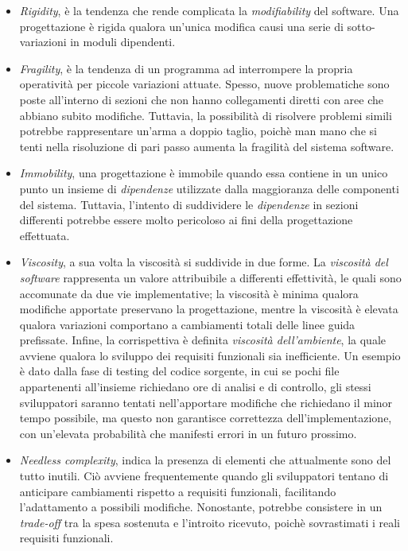 \documentclass{article}
\begin{document}
\begin{itemize}[label={-}]
    \itemsep0em
    \item \textit{Rigidity}, è la tendenza che rende complicata la \textit{modifiability} del software. Una progettazione è rigida qualora un'unica modifica causi una serie di sotto-variazioni in moduli dipendenti.
    \item \textit{Fragility}, è la tendenza di un programma ad interrompere la propria operatività per piccole variazioni attuate. Spesso, nuove problematiche sono poste all'interno di sezioni che non hanno collegamenti diretti con aree che abbiano subito modifiche. Tuttavia, la possibilità di risolvere problemi simili potrebbe rappresentare un'arma a doppio taglio, poichè man mano che si tenti nella risoluzione di pari passo aumenta la fragilità del sistema software.
    \item \textit{Immobility}, una progettazione è immobile quando essa contiene in un unico punto un insieme di \textit{dipendenze} utilizzate dalla maggioranza delle componenti del sistema. Tuttavia, l'intento di suddividere le \textit{dipendenze} in sezioni differenti potrebbe essere molto pericoloso ai fini della progettazione effettuata.
    \item \textit{Viscosity}, a sua volta la viscosità si suddivide in due forme. La \textit{viscosità del software} rappresenta un valore attribuibile a differenti effettività, le quali sono accomunate da due vie implementative; la viscosità è minima qualora modifiche apportate preservano la progettazione, mentre la viscosità è elevata qualora variazioni comportano a cambiamenti totali delle linee guida prefissate. Infine, la corrispettiva è definita \textit{viscosità dell'ambiente}, la quale avviene qualora lo sviluppo dei requisiti funzionali sia inefficiente. Un esempio è dato dalla fase di testing del codice sorgente, in cui se pochi file appartenenti all'insieme richiedano ore di analisi e di controllo, gli stessi sviluppatori saranno tentati nell'apportare modifiche che richiedano il minor tempo possibile, ma questo non garantisce correttezza dell'implementazione, con un'elevata probabilità che manifesti errori in un futuro prossimo.
    \item \textit{Needless complexity}, indica la presenza di elementi che attualmente sono del tutto inutili. Ciò avviene frequentemente quando gli sviluppatori tentano di anticipare cambiamenti rispetto a requisiti funzionali, facilitando l'adattamento a possibili modifiche. Nonostante, potrebbe consistere in un \textit{trade-off} tra la spesa sostenuta e l'introito ricevuto, poichè sovrastimati i reali requisiti funzionali.

\end{itemize}
\end{document}
